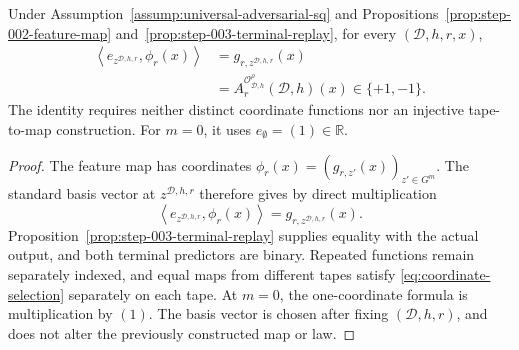 \begin{proposition}
\label{prop:step-003-one-hot-score}
Under Assumption~\ref{assump:universal-adversarial-sq} and
Propositions~\ref{prop:step-002-feature-map}
and~\ref{prop:step-003-terminal-replay}, for every
\((\mathcal D,h,r,x)\),
\[
\begin{aligned}
\left\langle e_{z^{\mathcal D,h,r}},\phi_r(x)\right\rangle
&=g_{r,z^{\mathcal D,h,r}}(x)\\
&=A_r^{\mathcal O^\rho_{\mathcal D,h}}(\mathcal D,h)(x)
\in\{+1,-1\}.
\end{aligned}
\tag{A.27}\label{eq:one-hot-output}
\]
The identity requires neither distinct coordinate functions nor an injective
tape-to-map construction.  For \(m=0\), it uses
\(e_{\emptyset}=(1)\in\mathbb R\).
\end{proposition}

\begin{proof}
The feature map has coordinates
\(\phi_r(x)=(g_{r,z'}(x))_{z'\in G^m}\).  The standard basis vector at
\(z^{\mathcal D,h,r}\) therefore gives by direct multiplication
\[
\left\langle e_{z^{\mathcal D,h,r}},\phi_r(x)\right\rangle
=g_{r,z^{\mathcal D,h,r}}(x).
\tag{A.28}\label{eq:coordinate-selection}
\]
Proposition~\ref{prop:step-003-terminal-replay} supplies equality with the
actual output, and both terminal predictors are binary.  Repeated functions
remain separately indexed, and equal maps from different tapes satisfy
\eqref{eq:coordinate-selection} separately on each tape.  At \(m=0\), the
one-coordinate formula is multiplication by \((1)\).  The basis vector is
chosen after fixing \((\mathcal D,h,r)\), and does not alter the previously
constructed map or law.
\end{proof}


